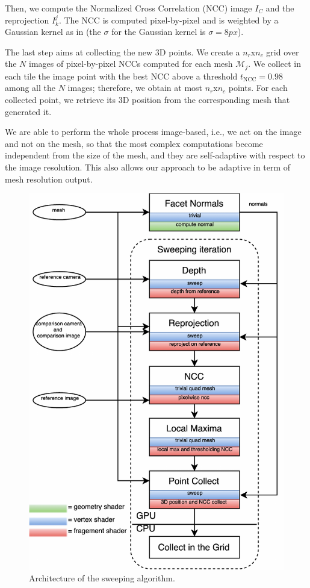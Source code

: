Then, we compute  the Normalized Cross Correlation (NCC) image $I_C$ and the reprojection $I_k^j$. 
The NCC is computed pixel-by-pixel and is weighted by a Gaussian kernel as in \cite{pons2007multi}  (the $\sigma$ for the Gaussian kernel is $\sigma = 8 px$).

The last step aims at collecting the new 3D points. We create a $n_r$x$n_c$ grid over the $N$ images of pixel-by-pixel NCCs computed for each mesh $\mathcal{M}_j$. We collect in each tile the image point with the best NCC above a threshold $t_{\text{NCC}} = 0.98$ among all the $N$ images; therefore, we obtain at most $n_r$x$n_c$ points.
For each collected point, we retrieve its 3D position from the corresponding mesh that generated it.

We are able to perform the whole process image-based, i.e., we act on the image and not on the mesh, so that the most complex computations become independent from the size of the mesh, and they are self-adaptive with respect to the  image resolution. This also allows our approach to be adaptive in term of mesh resolution output.

\begin{figure}[tp]
\centering
\includegraphics[height=0.99\textheight]{./img/ch-sweep/Sweep-shaders-architecture}
\caption{Architecture of the sweeping algorithm.}
\label{fig:sweep-arch}
\end{figure}

